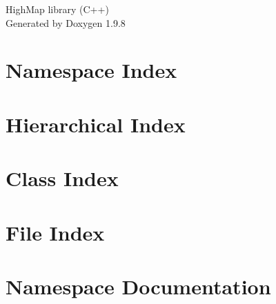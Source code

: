 \documentclass[twoside]{book}
\newcommand{\+}{\discretionary{\mbox{\scriptsize$\hookleftarrow$}}{}{}}
\newcommand{\clearemptydoublepage}{%
    \newpage{\pagestyle{empty}\cleardoublepage}%
  }
\begin{document}
  \raggedbottom
    \hypersetup{pageanchor=false,
                bookmarksnumbered=true,
                pdfencoding=unicode
               }
  \begin{titlepage}
  \vspace*{7cm}
  \begin{center}%
  {\Large High\+Map library (\+C++)}\\
  \vspace*{1cm}
  {\large Generated by Doxygen 1.9.8}\\
  \end{center}
  \end{titlepage}
  \clearemptydoublepage
  \tableofcontents
  \clearemptydoublepage
  \hypersetup{pageanchor=true}


\chapter{Namespace Index}

\chapter{Hierarchical Index}

\chapter{Class Index}

\chapter{File Index}

\chapter{Namespace Documentation}


\end{document}
